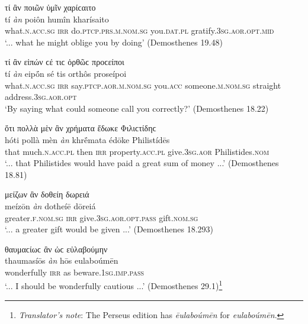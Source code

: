 \begin{exe}
\ex τί ἂν ποιῶν ὑμῖν χαρίϲαιτο\\
\gll tí \emph{àn} poiôn humîn kharísaito\\
what.\textsc{n.acc.sg} \textsc{irr} do.\textsc{ptcp.prs.m.nom.sg} you.\textsc{dat.pl} gratify.\textsc{3sg.aor.opt.mid}\\
\trans `... what he might oblige you by doing' (Demosthenes 19.48)
\label{wordgroup33}
\end{exe}

\begin{exe}
\ex τί ἂν εἰπών ϲέ τιϲ ὀρθῶϲ προϲείποι\\
\gll tí \emph{àn} eipṓn sé tis orthôs proseípoi\\
what.\textsc{n.acc.sg} \textsc{irr} say.\textsc{ptcp.aor.m.nom.sg} you.\textsc{acc} someone.\textsc{m.nom.sg} straight address.\textsc{3sg.aor.opt}\\
\trans `By saying what could someone call you correctly?' (Demosthenes 18.22)
\label{wordgroup34}
\end{exe}

\begin{exe}
\ex ὅτι πολλὰ μὲν ἂν χρήματα ἔδωκε Φιλιϲτίδηϲ\\
\gll hóti pollà mèn \emph{àn} khrḗmata édōke Philistídēs\\
that much.\textsc{n.acc.pl} then \textsc{irr} property.\textsc{acc.pl} give.\textsc{3sg.aor} Philistides.\textsc{nom}\\
\trans `... that Philistides would have paid a great sum of money ...' (Demosthenes 18.81)
\label{wordgroup35}
\end{exe}

\begin{exe}
\ex μείζων ἂν δοθείη δωρειά\\
\gll meízōn \emph{àn} dotheíē dōreiá\\
greater.\textsc{f.nom.sg} \textsc{irr} give.\textsc{3sg.aor.opt.pass} gift.\textsc{nom.sg}\\
\trans `... a greater gift would be given ...' (Demosthenes 18.293)
\label{wordgroup36}
\end{exe}

\begin{exe}
\ex θαυμαϲίωϲ ἂν ὡϲ εὐλαβούμην\\
\gll thaumasíōs \emph{àn} hōs eulaboúmēn\\
wonderfully \textsc{irr} as beware.\textsc{1sg.imp.pass}\\
\trans `... I should be wonderfully cautious ...' (Demosthenes 29.1)\footnote{\emph{Translator's note}: The Perseus edition has \textit{ēulaboúmēn} for \textit{eulaboúmēn}.}
\label{wordgroup37}
\end{exe}

